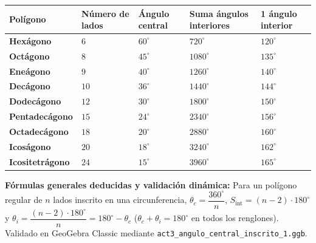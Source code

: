 \documentclass[spanish,letterpaper,landscape]{article}
\begin{document}
\noindent\begin{tabularx}{\textwidth}{|>{\raggedright\arraybackslash}p{}|>{\centering\arraybackslash}p{}|>{\centering\arraybackslash}p{}|>{\centering\arraybackslash}p{}|>{\centering\arraybackslash}X|}
\hline
\rowcolor{pPurple}
\color{white}\textbf{Polígono} &
\color{white}\textbf{Número de lados} &
\color{white}\textbf{Ángulo central} &
\color{white}\textbf{Suma ángulos interiores} &
\color{white}\textbf{1 ángulo interior} \\\hline
\rowcolor{pLilac} \textbf{Hexágono} & $6$ & $60^\circ$ & $720^\circ$ & $120^\circ$ \\\hline
\textbf{Octágono} & $8$ & $45^\circ$ & $1080^\circ$ & $135^\circ$ \\\hline
\rowcolor{pLilac} \textbf{Eneágono} & $9$ & $40^\circ$ & $1260^\circ$ & $140^\circ$ \\\hline
\textbf{Decágono} & $10$ & $36^\circ$ & $1440^\circ$ & $144^\circ$ \\\hline
\rowcolor{pLilac} \textbf{Dodecágono} & $12$ & $30^\circ$ & $1800^\circ$ & $150^\circ$ \\\hline
\textbf{Pentadecágono} & $15$ & $24^\circ$ & $2340^\circ$ & $156^\circ$ \\\hline
\rowcolor{pLilac} \textbf{Octadecágono} & $18$ & $20^\circ$ & $2880^\circ$ & $160^\circ$ \\\hline
\textbf{Icoságono} & $20$ & $18^\circ$ & $3240^\circ$ & $162^\circ$ \\\hline
\rowcolor{pLilac} \textbf{Icositetrágono} & $24$ & $15^\circ$ & $3960^\circ$ & $165^\circ$ \\\hline
\end{tabularx}

\vspace{8pt}
{\small\colorbox{pLilac}{\parbox{\dimexpr\textwidth-2\fboxsep\relax}{\textbf{Fórmulas generales deducidas y validación dinámica:} Para un polígono regular de $n$ lados inscrito en una circunferencia, $\theta_c = \dfrac{360^\circ}{n}$, $S_{\text{int}} = (n - 2)\cdot 180^\circ$ y $\theta_i = \dfrac{(n - 2)\cdot 180^\circ}{n} = 180^\circ - \theta_c$ ($\theta_c + \theta_i = 180^\circ$ en todos los renglones). Validado en GeoGebra Classic mediante \texttt{act3\_angulo\_central\_inscrito\_1.ggb}.}}}
\end{document}
